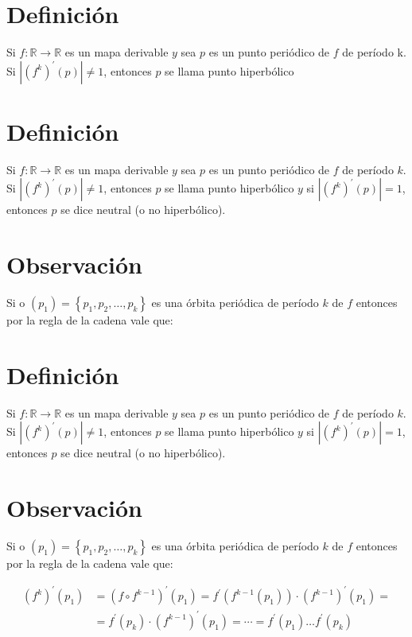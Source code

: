 \documentclass[11pt]{beamer}
\begin{document}
\section*{Definición}
Si $f: \mathbb{R} \rightarrow \mathbb{R}$ es un mapa derivable $y$ sea $p$ es un punto periódico de $f$ de período k. Si $\left|\left(f^{k}\right)^{\prime}(p)\right| \neq 1$, entonces $p$ se llama punto hiperbólico

\section*{Definición}
Si $f: \mathbb{R} \rightarrow \mathbb{R}$ es un mapa derivable $y$ sea $p$ es un punto periódico de $f$ de período $k$. Si $\left|\left(f^{k}\right)^{\prime}(p)\right| \neq 1$, entonces $p$ se llama punto hiperbólico $y$ si $\left|\left(f^{k}\right)^{\prime}(p)\right|=1$, entonces $p$ se dice neutral (o no hiperbólico).

\section*{Observación}
Si o $\left(p_{1}\right)=\left\{p_{1}, p_{2}, \ldots, p_{k}\right\}$ es una órbita periódica de período $k$ de $f$ entonces por la regla de la cadena vale que:

\section*{Definición}
Si $f: \mathbb{R} \rightarrow \mathbb{R}$ es un mapa derivable $y$ sea $p$ es un punto periódico de $f$ de período $k$. Si $\left|\left(f^{k}\right)^{\prime}(p)\right| \neq 1$, entonces $p$ se llama punto hiperbólico $y$ si $\left|\left(f^{k}\right)^{\prime}(p)\right|=1$, entonces $p$ se dice neutral (o no hiperbólico).

\section*{Observación}
Si o $\left(p_{1}\right)=\left\{p_{1}, p_{2}, \ldots, p_{k}\right\}$ es una órbita periódica de período $k$ de $f$ entonces por la regla de la cadena vale que:


\begin{align*}
\left(f^{k}\right)^{\prime}\left(p_{1}\right) & =\left(f \circ f^{k-1}\right)^{\prime}\left(p_{1}\right)=f^{\prime}\left(f^{k-1}\left(p_{1}\right)\right) \cdot\left(f^{k-1}\right)^{\prime}\left(p_{1}\right)=  \tag{1}\\
& =f^{\prime}\left(p_{k}\right) \cdot\left(f^{k-1}\right)^{\prime}\left(p_{1}\right)=\cdots=f^{\prime}\left(p_{1}\right) \ldots f^{\prime}\left(p_{k}\right) \tag{2}
\end{align*}
\end{document}
